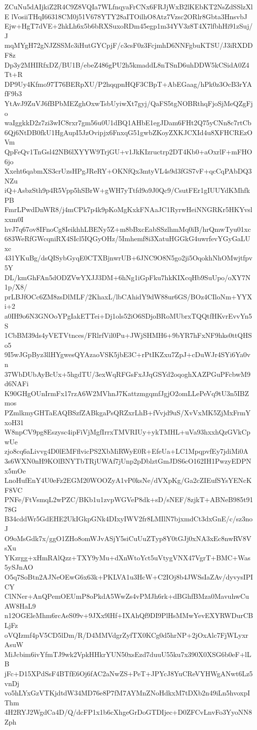 ZCuNu5dAIjkiZ2R4C9Z8VQIa7WLfnqyaFrCNx6FRJjWxB2lKEbKT2NsZdSSlzXlE
lVosiiTHqI66318CM0j51V678YTY28aITOilhO8Atz7Vzsc2ORlr8Gbta3HnsvbJ
Ejw+HgT7dVE+2hkLh6x5b6bRXSuxoRDm45egp1m34YV3z8T4X7lfbhHi91zSuj/J
mqMYgH72gNJZSSMc3iHutGYCpjF/c3csF0z3FcjmhD6NNFgbuKTSU/J3iRXDDF8z
Dp3y2MHIRfxDZ/BU1B/ebeZ486gPU2h5kmaddL8nTSnD6uhDDW5kCSidA0Z4Tt+R
DP9Uy4Kfmo97T76BERpXU/P2hqqpnHQF3CBpT+AbEGaag/hPk0z3OcB3rYAfF9b3
YtAvJ9ZuVJ6fBPbMEZghOxwTsbUyiwXt7gyj/QaFS5tgNOBRthqFjoSjMeQZgFjo
waIggkkD2z7zi3wIC8rxr7gm56u0U1dBQ1AHbE1egJDam6FHt2Q75yCNn8c7rtCb
6Qj6NtDB0fkU1HgAupI5JzOvipjx6FnxqG51gwbZKoyZXKJCXId4u8XFHCREzOVm
QpFeQv1TnGsl42NB6lXYYW9TrjGU+v1JkKIzructrp2DT4Kb0+aOxrlF+mFHO6jo
Xxeht6qabmXS3crUzsHPgJReRY+OKNfQx3mtyVL4s9d3fGS7vF+qcCqPAbDQ3NZu
iQ+AsbzSth9p4R5Vpp5hSBrW+gWH7yTtfd9o9J0Qc9/CsutFEr1gIUUYdKMhfkPB
FmrLPwdDnWR8/j4mCPk7p4k9pKoMgKxkFNAaJC1RyrwHeiNNGRKr5HKYvslxxm0I
hvJ7q67ov8IFnoCg8IeikhhLBENy5Z+m8bBxcEabSSzlhmMq0iB/hrQmwTyu01xc
683WeRfGWcqniRX4SIcl5IQGyOHz/5Imhemf8i3XatuHGGkG4uwrfevYGyGaLUxc
431YKuBg/dsQISybGyqE0CTXBjnwrUB+6JNC9O8N5go2ji5OqokhNhOMwjtfpv5Y
DL/kmGhFAn5dODZVwYXJJ3DM+6hNg1iGpFku7hkKIXcqHb9SuUpo/oXY7N1p/X8/
prLBJfOCc6ZM8zsDlMLF/2KhaxL/lbCAhidY9dW88ur6GS/BOz4CIloNm+YYXi+2
a0IH9o6N3GNOoYPgIakETTei+Dj1ols52iO6SDjoBRoMUbrxTQQtfHKvrEvvYn5S
1CbBM39ds4yVETVtnces/FRlrfVil0Pu+JWjSHMH6+9bYR7hFxNF9hks0ttQHSo5
9I5wJGpByz3llHYgwesQYAzaoVSK5jbE3C+rPtIKZxu7ZpJ+cDuWJr4SYi6Ya0vn
37WbDUbAyBcUx+5hgdTU/3exWqRFGsFxJJqGSYd2oqoghXAZPGuPFcbwM9d6NAFi
K90GHgOUnIrmFx17rzA6W2MVhnJ7KattzmgqmfJgjO2omLLePeVq9tU3n5IBZmos
PZmlkmyGHTaEAQBSzfZABkgaPsQRZxrLhB+fVvjd9uS/XvVxMK5ZjMxFrmYxoH31
W8npCV9pg8Eszysc4ipFiVjMgfIrrxTMVRIUy+ykTMHL+uVa93hxxhQzGVkCpwUe
zjo8cq6aLivvg4D0lEMFflvicPS2XbMiRWyE0R+EfeUa+LC1MpqpvfEy7jdiMi0A
3s6WXN0nH9KOlBNYTbTRjUWAf7jUnp2pDblztGmJDS6cO162IH1PwzyEDPNx5mOe
LnoHufEnY4U0eFz2EGM20WOOZyA1vP0ksNe/dVXpKg/Ga2cZIEufSYsYENcKF8VC
PNFe/FtVsmqL2wPZC/BKb1u1zvpWGVeP8dk+sD/sNEF/8zjkT+ABNeB985t9178G
B34cddWr5GdEHE2UkIGkpGNk4DIxyIWV2fr8LMIlN7bjxmdCt3dxGnE/c/sz3noJ
O9oMsGdk7x/ggO1ZHo8omWJvASjY5siCuUuZTyp8Y0tGJj0xNA3xEc8nwRV8VsXu
YKzrgg+xHmRAlQzz+TXY9yMu+dXnWtoYct5uVtygVNX47VgrT+BMC+Was5ySJnAO
O5q7SoBtn2AJNeOEwG6x63k+PKLVA1u3HcW+C2IOj8b4JWSsIaZAv/dyvysIPICY
ClNNer+AnQPemOEUmP8oPkdA5WwZs4vPMJh6rk+dBGhfBMza0MavuhwCuAW8HaL9
n12OGEleMhm6rcAeS09v+9JXx9lHf+IXAhQf9DI9PlHsMMwYevEXYRWDurCBLjFz
oVQIzmf4pV5CD5lDm/R/D4MMVdgrZyfTX0KCg0d5hrNP+2jOxAlc7FjWLyxrAsuW
MiJcbim6ivYfmTJ9wk2VpkHHkrYUN50xsEzd7duuU55ku7x390X0XSG6b0eF+lLB
jFc+D15XPdSsF4BTfE6Oj6fAC2aNwZS+PeT+JPYcJ8YuCReVYHWgANwt6Lz5vnDj
vo5hLYxGzVTKjdtdW34MD76e8P7fM7AYMnZNoHdkxM7tDXb2n49iLn5hvoxpIThm
4H2RYJ2WgdCa4D/Q/dcFP1x1b6cXhgeGrDoGTDIjec+D0ZFCvLnvFo3YyoNN8Zph
